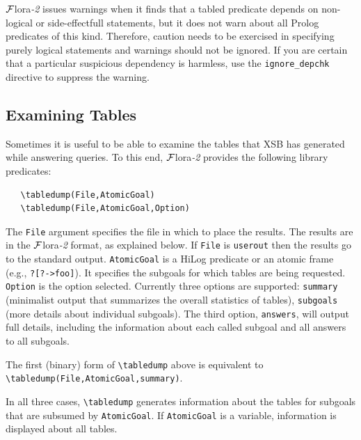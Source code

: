 \documentclass[11pt]{article}
\newcommand{\FLORA}{{\mbox{\sc ${\cal F}${lora}\rm\emph{-2}}}\xspace}
\newcommand{\FLSYSTEM}{\FLORA}
\newcommand{\bs}{\textbackslash}
\begin{document}
\FLSYSTEM issues warnings when it finds that a tabled predicate depends on
non-logical or side-effectfull statements, but it does not warn about all
Prolog predicates of this kind. Therefore, caution needs to be exercised in
specifying purely logical statements and warnings should not be ignored.
If you are certain that a particular suspicious dependency
is harmless, use the {\tt ignore\_depchk} directive to suppress the warning.


\ifdef{\isfloraman}{}
{
  
}


\subsection{Examining Tables}\label{sec-tabledump}

Sometimes it is useful to be able to examine the tables that XSB has
generated while answering queries. To this end, \FLSYSTEM provides 
the following library predicates:
\index{\bs{}tabledump}
\begin{verbatim}
   \tabledump(File,AtomicGoal)
   \tabledump(File,AtomicGoal,Option)
\end{verbatim}
The \texttt{File} argument specifies the file in which to place the results.
The results are in the \FLSYSTEM format, as explained below.
If \texttt{File} is \texttt{userout} then the results go to the standard
output.  \texttt{AtomicGoal} is a HiLog predicate or an atomic frame
(e.g., \texttt{?[?->foo]}).
It specifies the subgoals for which tables are
being requested.
\texttt{Option} is the option selected. Currently three options are
supported:
\texttt{summary} (minimalist output that summarizes the overall statistics
of tables), \texttt{subgoals} (more details about individual subgoals). The
third option, \texttt{answers},
will output full details, including the information about each called subgoal
and all answers to all
subgoals.

The first (binary) form of \texttt{\bs{}tabledump}  above is equivalent to
\texttt{\bs{}tabledump(File,AtomicGoal,summary)}. 

In all three cases, \texttt{\bs{}tabledump} generates information
about the tables for subgoals that are subsumed by \texttt{AtomicGoal}. If
\texttt{AtomicGoal} is a variable, information is displayed about all
tables.   
\end{document}
